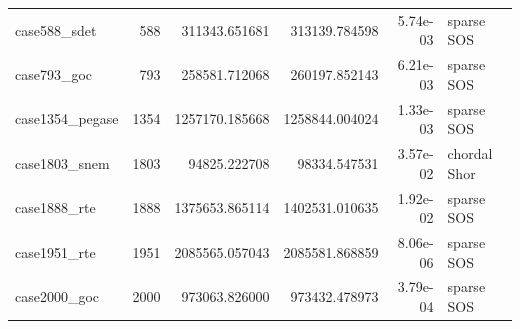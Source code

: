 \begin{longtable}{@{}l r r r r l@{}}
case588\_sdet & 588 & 311343.651681 & 313139.784598 & 5.74e-03 & sparse SOS\\
case793\_goc & 793 & 258581.712068 & 260197.852143 & 6.21e-03 & sparse SOS\\
case1354\_pegase & 1354 & 1257170.185668 & 1258844.004024 & 1.33e-03 & sparse SOS\\
case1803\_snem & 1803 & 94825.222708 & 98334.547531 & 3.57e-02 & chordal Shor\\
case1888\_rte & 1888 & 1375653.865114 & 1402531.010635 & 1.92e-02 & sparse SOS\\
case1951\_rte & 1951 & 2085565.057043 & 2085581.868859 & 8.06e-06 & sparse SOS\\
case2000\_goc & 2000 & 973063.826000 & 973432.478973 & 3.79e-04 & sparse SOS\\
\bottomrule\end{longtable}

